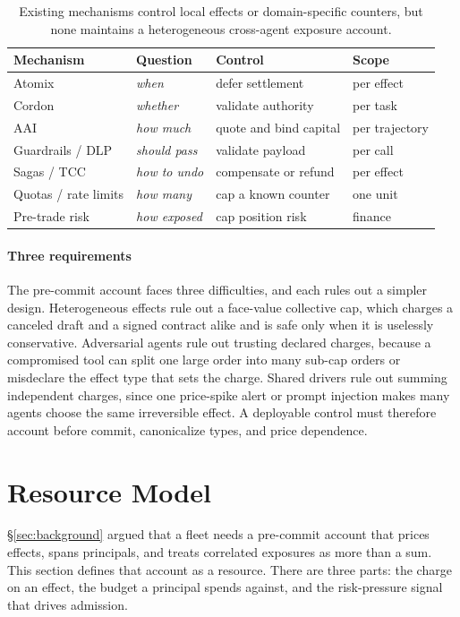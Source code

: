 \documentclass[sigconf]{acmart}
\begin{document}
\begin{table}[t]
\centering
\footnotesize
\caption{Existing mechanisms control local effects or domain-specific counters, but none maintains a heterogeneous cross-agent exposure account.}
\label{tab:policies}
\setlength{\tabcolsep}{4pt}
\begin{tabular}{@{}llll@{}}
\toprule
Mechanism & Question & Control & Scope \\
\midrule
Atomix~\cite{Mohammadi2026Atomix} & \emph{when} & defer settlement & per effect \\
Cordon~\cite{Chen2026Cordon} & \emph{whether} & validate authority & per task \\
AAI~\cite{Chen2026AAI} & \emph{how much} & quote and bind capital & per trajectory \\
Guardrails / DLP~\cite{OWASP2025AgenticThreats} & \emph{should pass} & validate payload & per call \\
Sagas / TCC~\cite{GarciaMolina1987Sagas,Helland2007LifeBeyond} & \emph{how to undo} & compensate or refund & per effect \\
Quotas / rate limits & \emph{how many} & cap a known counter & one unit \\
Pre-trade risk & \emph{how exposed} & cap position risk & finance \\
\bottomrule
\end{tabular}
\end{table}

\paragraph{Three requirements} The pre-commit account faces three difficulties, and each rules out a simpler design. Heterogeneous effects rule out a face-value collective cap, which charges a canceled draft and a signed contract alike and is safe only when it is uselessly conservative. Adversarial agents rule out trusting declared charges, because a compromised tool can split one large order into many sub-cap orders or misdeclare the effect type that sets the charge. Shared drivers rule out summing independent charges, since one price-spike alert or prompt injection makes many agents choose the same irreversible effect. A deployable control must therefore account before commit, canonicalize types, and price dependence.

\section{Resource Model}
\label{sec:resource}
\S\ref{sec:background} argued that a fleet needs a pre-commit account that prices effects, spans principals, and treats correlated exposures as more than a sum. This section defines that account as a resource. There are three parts: the charge on an effect, the budget a principal spends against, and the risk-pressure signal that drives admission.
\end{document}
